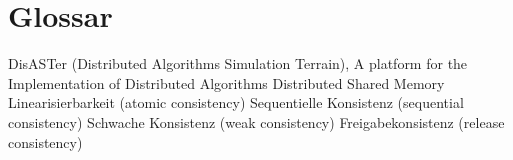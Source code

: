 \chapter{Glossar}

		{DisASTer (Distributed Algorithms Simulation Terrain), A platform for the Implementation of Distributed Algorithms}
			{Distributed Shared Memory}
			{Linearisierbarkeit (atomic consistency)}
			{Sequentielle Konsistenz (sequential consistency)}
			{Schwache Konsistenz (weak consistency)}
			{Freigabekonsistenz (release consistency)}
